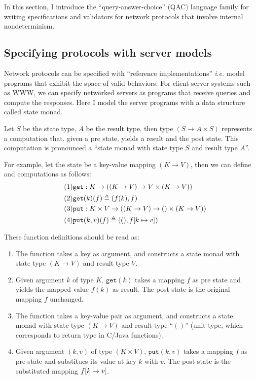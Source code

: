 In this section, I introduce the ``query-answer-choice'' (QAC) language family
for writing specifications and validators for network protocols that involve
internal nondeterminism.

\subsection{Specifying protocols with server models}
\label{sec:qac-model}
Network protocols can be specified with ``reference implementations'' {\it i.e.}
model programs that exhibit the space of valid behaviors.  For client-server
systems such as WWW, we can specify networked servers as programs that receive
queries and compute the responses.  Here I model the server programs with a data
structure called state monad.

\begin{definition}
  Let $S$ be the state type, $A$ be the result type, then type $(S\to A\times
  S)$ represents a computation that, given a pre state, yields a result and the
  post state.  This computation is pronounced a ``state monad with state type
  $S$ and result type $A$''.

  For example, let the state be a key-value mapping $(K\to V)$, then we can
  define  and  computations as follows:
  \begin{align}
    \tag{1}&\mathtt{get}:K\to((K\to V)\to V\times(K\to V))\\
    \tag{2}&\mathtt{get}(k)(f)\triangleq (f(k), f)\\
    \tag{3}&\mathtt{put}:K\times V\to((K\to V)\to ()\times(K\to V))\\
    \tag{4}&\mathtt{put}(k,v)(f)\triangleq((),f[k\mapsto v])
  \end{align}

  These function definitions should be read as:
  \begin{enumerate}
    \item The  function takes a key as argument, and constructs a
      state monad with state type $(K\to V)$ and result type $V$.
    \item Given argument $k$ of type $K$, $\mathtt{get}(k)$ takes a mapping $f$
      as pre state and yields the mapped value $f(k)$ as result.  The post state
      is the original mapping $f$ unchanged.
    \item The  function takes a key-value pair as argument, and
      constructs a state monad with state type $(K\to V)$ and result type
      ``$()$'' (unit type, which corresponds to  return type in
      C/Java functions).
    \item Given argument $(k,v)$ of type $(K\times V)$, $\mathtt{put}(k,v)$
      takes a mapping $f$ as pre state and substitues its value at key $k$ with
      $v$.  The post state is the substituted mapping $f[k\mapsto v]$.
  \end{enumerate}
\end{definition}

